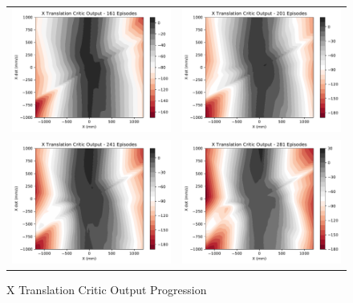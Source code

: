 \begin{figure}
\begin{tabular}{cc}
		\includegraphics[width=65mm]{figures/train_figs/transx_critic/Critic1_161.pdf} &   \includegraphics[width=65mm]{figures/train_figs/transx_critic/Critic1_201.pdf} \\
		\includegraphics[width=65mm]{figures/train_figs/transx_critic/Critic1_241.pdf} &   \includegraphics[width=65mm]{figures/train_figs/transx_critic/Critic1_281.pdf} \\
	\end{tabular}
	\caption{X Translation Critic Output Progression}\label{fig:x_critic_contour}
\end{figure}

